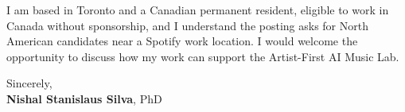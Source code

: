 \documentclass[11pt]{article}
\newcommand{\clName}{Nishal Stanislaus Silva}
\newcommand{\clTeam}{Artist-First AI Music Lab}
\begin{document}
I am based in Toronto and a Canadian permanent resident, eligible to work in Canada without sponsorship, and I understand the posting asks for North American candidates near a Spotify work location. I would welcome the opportunity to discuss how my work can support the \clTeam{}.

\vspace{8pt}
Sincerely,\\[2pt]
\textbf{\clName}, PhD
\end{document}
